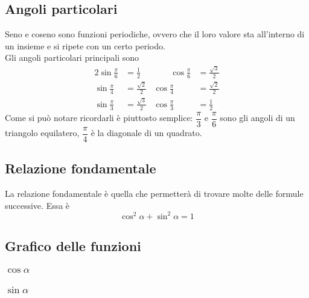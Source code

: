 \subsection{Angoli particolari}
Seno e coseno sono funzioni periodiche, ovvero che il loro valore sta all'interno di un insieme e si
ripete con un certo periodo.\\
Gli angoli particolari principali sono
\begin{alignat*}{2}
  \sin\frac{\pi}{6} &= \frac{1}{2} &\qquad \cos\frac{\pi}{6} &= \frac{\sqrt{3}}{2}\\
  \sin\frac{\pi}{4} &= \frac{\sqrt{2}}{2} & \cos\frac{\pi}{4} &= \frac{\sqrt{2}}{2}\\
  \sin\frac{\pi}{3} &= \frac{\sqrt{3}}{2} & \cos\frac{\pi}{3} &= \frac{1}{2}
\end{alignat*}
Come si può notare ricordarli è piuttosto semplice: $\dfrac{\pi}{3}$ e $\dfrac{\pi}{6}$ sono gli 
angoli di un triangolo equilatero, $\dfrac{\pi}{4}$ è la diagonale di un quadrato.

\subsection{Relazione fondamentale}
La relazione fondamentale è quella che permetterà di trovare molte delle formule successive. Essa è
\begin{equation*}
  \cos^2\alpha + \sin^2\alpha = 1
\end{equation*}

\subsection{Grafico delle funzioni}
\subsubsection{$\cos\alpha$}
\begin{center}
\end{center}
\subsubsection{$\sin\alpha$}
\begin{center}
\end{center}
